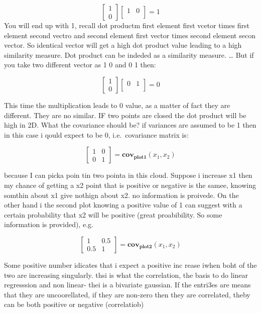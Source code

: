 \documentclass[
  12pt,
  a4paper,
  oneside]{book}
\theoremstyle{definition}
\theoremstyle{definition}
\theoremstyle{definition}
\theoremstyle{remark}
\begin{document}
\[
\left[\begin{array}{ll}
1 \\
0
\end{array}\right]\left[\begin{array}{ll}
1 & 0 \\
\end{array}\right] = 1
\]
You will end up with 1, recall dot productm first element first vcetor times first element second vectro and second element first vector times second element secon vector. So identical vector will get a high dot product value leading to a high similarity measure. Dot product can be indeded as a similarity measure.
\ldots{} But if you take two different vector as 1 0 and 0 1 then:

\[
\left[\begin{array}{ll}
1 \\
0
\end{array}\right]\left[\begin{array}{ll}
0 & 1 \\
\end{array}\right] = 0
\]

This time the multiplication leads to 0 value, as a matter of fact they are different. They are no similar.
IF two points are closed the dot product will be high in 2D. What the covariance should be? if variances are assumed to be 1 then in this case i qould expect to be 0, i.e.~covariance matrix is:

\[
\left[\begin{array}{ll}
1 & 0 \\
0 & 1
\end{array}\right] = \mathbf{cov_{plot1}}(x_1,x_2)
\]

because I can picka poin tin two pointa in this cloud. Suppose i increase x1 then my chance of getting a x2 point that is positive or negative is the samee, knowing somthin about x1 give nothign about x2. no information is proivede. On the other hand i the second plot knowing a positive value of 1 can suggest with a certain probability that x2 will be positive (great proabibility. So some information is provided), e.g.

\[
\left[\begin{array}{ll}
1   & 0.5 \\
0.5 & 1
\end{array}\right] = \mathbf{cov_{plot2}}(x_1,x_2)
\]

Some positive number idicates that i expect a positive inc rease iwhen boht of the two are increasing singularly. thsi is what the correlation, the basis to do linear regresssion and non linear- thei is a bivariate gaussian. If the entri3es are means that they are uncoorellated, if they are non-zero then they are correlated, theby can be both positive or negative (correlatiob)
\end{document}
